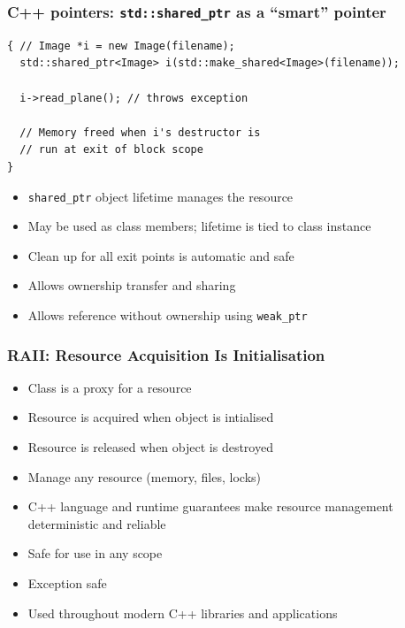\documentclass{beamer}
\begin{document}
\begin{frame}[fragile]
  \frametitle{C++ pointers: \texttt{std::shared\_ptr} as a “smart” pointer}
  \begin{lstlisting}
{ // Image *i = new Image(filename);
  std::shared_ptr<Image> i(std::make_shared<Image>(filename));

  i->read_plane(); // throws exception

  // Memory freed when i's destructor is
  // run at exit of block scope
}

\end{lstlisting}
  \begin{itemize}
    \item \texttt{shared\_ptr} object lifetime manages the resource
    \item May be used as class members; lifetime is tied to class instance
    \item Clean up for all exit points is automatic and safe
    \item Allows ownership transfer and sharing
    \item Allows reference without ownership using \texttt{weak\_ptr}
  \end{itemize}
\end{frame}

\begin{frame}[fragile]
  \frametitle{RAII: Resource Acquisition Is Initialisation}
    \begin{itemize}
    \item Class is a proxy for a resource
    \item Resource is acquired when object is intialised
    \item Resource is released when object is destroyed
    \item Manage any resource (memory, files, locks)
    \item C++ language and runtime guarantees make resource management
      deterministic and reliable
    \item Safe for use in any scope
    \item Exception safe
    \item Used throughout modern C++ libraries and applications
    \end{itemize}
\end{frame}
\end{document}
